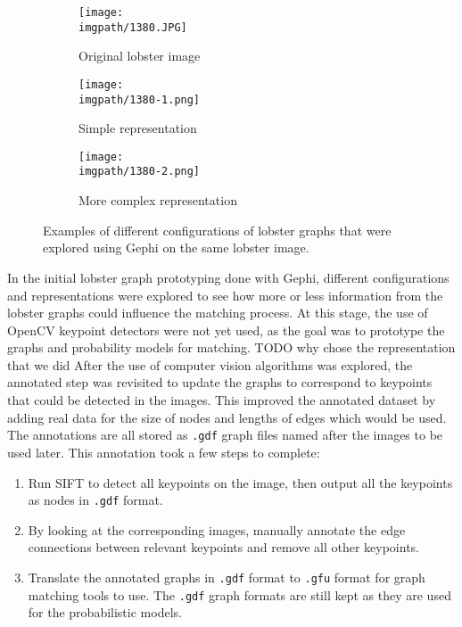 \begin{figure}[H]
\centering
	\begin{subfigure}{0.31\textwidth}
		\texttt{[image: \\imgpath/1380.JPG]}
		\caption{Original lobster image}
	\end{subfigure}
	\hspace*{\fill}
	\begin{subfigure}{0.31\textwidth}
		\texttt{[image: \\imgpath/1380-1.png]}
		\caption{Simple representation}
	\end{subfigure}
	\hspace*{\fill}
	\begin{subfigure}{0.31\textwidth}
		\texttt{[image: \\imgpath/1380-2.png]}
		\caption{More complex representation}
	\end{subfigure}
\caption{Examples of different configurations of lobster graphs that were explored using Gephi on the same lobster image.}
\end{figure}
\noindent
In the initial lobster graph prototyping done with Gephi, different configurations and representations were explored to see how more or less information from the lobster graphs could influence the matching process. At this stage, the use of OpenCV keypoint detectors were not yet used, as the goal was to prototype the graphs and probability models for matching. 
\n
TODO why chose the representation that we did
\n
After the use of computer vision algorithms was explored, the annotated step was revisited to update the graphs to correspond to keypoints that could be detected in the images. This improved the annotated dataset by adding real data for the size of nodes and lengths of edges which would be used. The annotations are all stored as \texttt{.gdf} graph files named after the images to be used later. This annotation took a few steps to complete:
\begin{enumerate}
\item Run SIFT to detect all keypoints on the image, then output all the keypoints as nodes in \texttt{.gdf} format.
\item By looking at the corresponding images, manually annotate the edge connections between relevant keypoints and remove all other keypoints.
\item Translate the annotated graphs in \texttt{.gdf} format to \texttt{.gfu} format for graph matching tools to use. The \texttt{.gdf} graph formats are still kept as they are used for the probabilistic models.
\end{enumerate}

